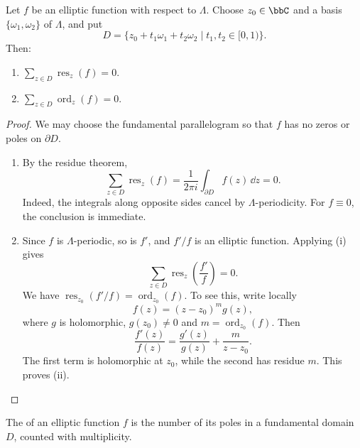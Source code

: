 \begin{theorem}\label{Thm:MF_elliptic_residues}
    Let $f$ be an elliptic function with respect to $\Lambda$. Choose $z_0 \in \bbC$ and a basis $\{\omega_1, \omega_2\}$ of $\Lambda$, and put
    \[
        D = \{z_0 + t_1\omega_1 + t_2\omega_2 \mid t_1, t_2 \in [0, 1)\}.
    \]
    Then:
    \begin{enumerate}[label=(\roman*)]
        \item $\sum_{z \in D}\operatorname{res}_z(f) = 0$.
        \item $\sum_{z \in D}\operatorname{ord}_z(f) = 0$.
    \end{enumerate}
\end{theorem}

\begin{proof}
    We may choose the fundamental parallelogram so that $f$ has no zeros or poles on $\partial D$.
    \begin{enumerate}[label=(\roman*)]
        \item By the residue theorem,
        \[
            \sum_{z \in D}\operatorname{res}_z(f) = \frac{1}{2\pi i}\int_{\partial D}f(z)\,\dd z = 0.
        \]
        Indeed, the integrals along opposite sides cancel by $\Lambda$-periodicity. For $f \equiv 0$, the conclusion is immediate.

        \item Since $f$ is $\Lambda$-periodic, so is $f'$, and $f'/f$ is an elliptic function. Applying (i) gives
        \[
            \sum_{z \in D}\operatorname{res}_z\left(\frac{f'}{f}\right) = 0.
        \]
        We have $\operatorname{res}_{z_0}(f'/f) = \operatorname{ord}_{z_0}(f)$. To see this, write locally
        \[
            f(z) = (z - z_0)^m g(z),
        \]
        where $g$ is holomorphic, $g(z_0) \neq 0$ and $m = \operatorname{ord}_{z_0}(f)$. Then
        \[
            \frac{f'(z)}{f(z)} = \frac{g'(z)}{g(z)} + \frac{m}{z - z_0}.
        \]
        The first term is holomorphic at $z_0$, while the second has residue $m$. This proves (ii).
    \end{enumerate}
\end{proof}

\begin{definition}\label{Def:MF_elliptic_order}
    The  of an elliptic function $f$ is the number of its poles in a fundamental domain $D$, counted with multiplicity.
\end{definition}

